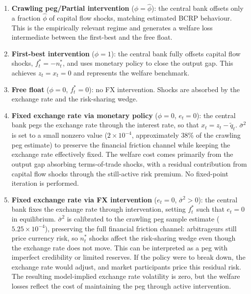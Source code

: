 \documentclass[12pt,a4paper]{article}
\begin{document}
\begin{enumerate}
    \item \textbf{Crawling peg/Partial intervention} ($\phi = \hat{\phi}$): the central bank offsets only a fraction $\hat{\phi}$ of capital flow shocks, matching estimated BCRP behaviour. This is the empirically relevant regime and generates a welfare loss intermediate between the first-best and the free float.
        
    \item \textbf{First-best intervention} ($\phi = 1$): the central bank fully offsets capital flow shocks, $f^*_t = -n^*_t$, and uses monetary policy to close the output gap. This achieves $z_t = x_t = 0$ and represents the welfare benchmark.

    \item \textbf{Free float} ($\phi = 0$, $f^*_t = 0$): no FX intervention. Shocks are absorbed by the exchange rate and the risk-sharing wedge.
    
    \item \textbf{Fixed exchange rate via monetary policy} ($\phi = 0$, $e_t = 0$): the central bank pegs the exchange rate through the interest rate, so that $x_t = z_t - \tilde{q}_t$. $\bar{\sigma}^2$ is set to a small nonzero value ($2 \times 10^{-4}$, approximately 38\% of the crawling peg estimate) to preserve the financial friction channel while keeping the exchange rate effectively fixed. The welfare cost comes primarily from the output gap absorbing terms-of-trade shocks, with a residual contribution from capital flow shocks through the still-active risk premium. No fixed-point iteration is performed.
    
    \item \textbf{Fixed exchange rate via FX intervention} ($e_t = 0$, $\bar{\sigma}^2 > 0$): the central bank fixes the exchange rate through intervention, setting $f^*_t$ such that $e_t = 0$ in equilibrium. $\bar{\sigma}^2$ is calibrated to the crawling peg sample estimate ($5.25 \times 10^{-4}$), preserving the full financial friction channel: arbitrageurs still price currency risk, so $n^*_t$ shocks affect the risk-sharing wedge even though the exchange rate does not move. This can be interpreted as a peg with imperfect credibility or limited reserves. If the policy were to break down, the exchange rate would adjust, and market participants price this residual risk. The resulting model-implied exchange rate volatility is zero, but the welfare losses reflect the cost of maintaining the peg through active intervention.

\end{enumerate}
\end{document}
